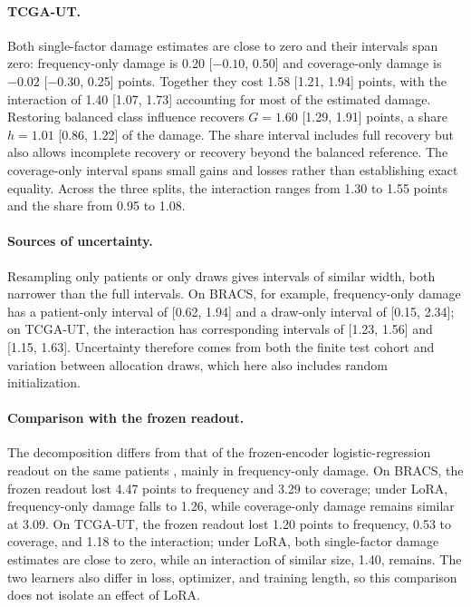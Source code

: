 \paragraph{TCGA-UT.} Both single-factor damage estimates are close to zero and their intervals span zero: frequency-only damage is 0.20 [$-0.10$, 0.50] and coverage-only damage is $-0.02$ [$-0.30$, 0.25] points. Together they cost 1.58 [1.21, 1.94] points, with the interaction of 1.40 [1.07, 1.73] accounting for most of the estimated damage. Restoring balanced class influence recovers $G = 1.60$ [1.29, 1.91] points, a share $h = 1.01$ [0.86, 1.22] of the damage. The share interval includes full recovery but also allows incomplete recovery or recovery beyond the balanced reference. The coverage-only interval spans small gains and losses rather than establishing exact equality. Across the three splits, the interaction ranges from 1.30 to 1.55 points and the share from 0.95 to 1.08.

\paragraph{Sources of uncertainty.} Resampling only patients or only draws gives intervals of similar width, both narrower than the full intervals. On BRACS, for example, frequency-only damage has a patient-only interval of [0.62, 1.94] and a draw-only interval of [0.15, 2.34]; on TCGA-UT, the interaction has corresponding intervals of [1.23, 1.56] and [1.15, 1.63]. Uncertainty therefore comes from both the finite test cohort and variation between allocation draws, which here also includes random initialization.

\paragraph{Comparison with the frozen readout.} The decomposition differs from that of the frozen-encoder logistic-regression readout on the same patients \citep{queisler2026causeBracs,queisler2026causeTcga}, mainly in frequency-only damage. On BRACS, the frozen readout lost 4.47 points to frequency and 3.29 to coverage; under LoRA, frequency-only damage falls to 1.26, while coverage-only damage remains similar at 3.09. On TCGA-UT, the frozen readout lost 1.20 points to frequency, 0.53 to coverage, and 1.18 to the interaction; under LoRA, both single-factor damage estimates are close to zero, while an interaction of similar size, 1.40, remains. The two learners also differ in loss, optimizer, and training length, so this comparison does not isolate an effect of LoRA.

